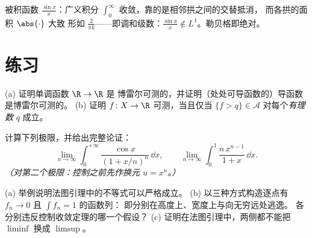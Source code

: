 \begin{omfigure}

{\small 被积函数 $\frac{\sin x}x$：广义积分
$\int_0^\infty$ 收敛，靠的是相邻拱之间的交替抵消，
而各拱的面积 $\abs{\cdot}$ 大致
形如 $\frac2{\pi k}$——即调和级数：$\frac{\sin x}x
\notin L^1$。勒贝格即绝对。}
\end{omfigure}

\section{练习}

\begin{exercise}[$\star$]\label{exo:b3:lebesgue:1}
(a) 证明单调函数 $\R \to \R$ 是
博雷尔可测的，并证明（处处可导函数的）导函数
是博雷尔可测的。
(b) 证明 $f \colon X \to \R$ 可测，当且仅当 $\{f > q\}
\in \mathcal A$ 对每个\emph{有理数} $q$ 成立。
\end{exercise}

\begin{exercise}[$\star$]\label{exo:b3:lebesgue:2}
计算下列极限，并给出完整论证：
\[
\lim_{n\to\infty}\int_0^{+\infty}
\frac{\cos x}{(1 + x/n)^{n}}\,\dd x,
\qquad
\lim_{n\to\infty}\int_0^1 \frac{n\,x^{n-1}}{1 + x}\,\dd x .
\]
\emph{（对第二个极限：控制之前先作换元 $u = x^n$。）}
\end{exercise}

\begin{exercise}[$\star\star$]\label{exo:b3:lebesgue:3}
(a) 举例说明法图引理中的不等式可以严格成立。
(b) 以三种方式构造逐点有 $f_n \to 0$ 且 $\int f_n = 1$ 的函数列：
即分别在高度上、宽度上与向无穷远处逃逸。
各分别违反控制收敛定理的哪一个假设？
(c) 证明在法图引理中，两侧都不能把 $\liminf$ 换成
$\limsup$。
\end{exercise}

